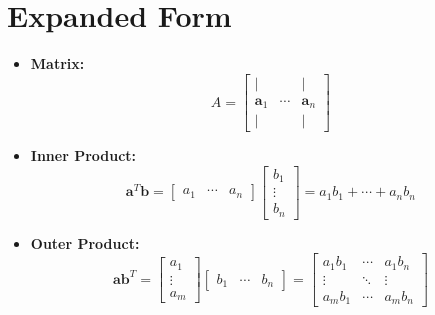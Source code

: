 \documentclass{article}
\begin{document}
\newpage
\appendix
\section{Expanded Form}

\begin{itemize}

    \item \textbf{Matrix:}
    \begin{equation}
        A =
        \left[
            \begin{array}{ccc}
                | &        & | \\
                \mathbf{a}_1 & \cdots & \mathbf{a}_n \\
                | &        & |
            \end{array}
        \right]
        \label{eq:matrix}
    \end{equation}

    \item \textbf{Inner Product:}
    \begin{equation}
        \mathbf{a}^T \mathbf{b} =
        \left[
            \begin{array}{ccc}
                a_1 & \cdots & a_n
            \end{array}
        \right]
        \left[
            \begin{array}{c}
                b_1 \\
                \vdots \\
                b_n
            \end{array}
        \right]
        = a_1 b_1 + \cdots + a_n b_n
        \label{eq:innerprod}
    \end{equation}

    \item \textbf{Outer Product:}
    \begin{equation}
        \mathbf{a} \mathbf{b}^T =
        \left[
            \begin{array}{c}
                a_1 \\
                \vdots \\
                a_m
            \end{array}
        \right]
        \left[
            \begin{array}{ccc}
                b_1 & \cdots & b_n
            \end{array}
        \right]
        =
        \left[
            \begin{array}{ccc}
                a_1 b_1 & \cdots & a_1 b_n \\
                \vdots & \ddots & \vdots \\
                a_m b_1 & \cdots & a_m b_n
            \end{array}
        \right]
        \label{eq:outerprod}
    \end{equation}


\end{itemize}
\end{document}
